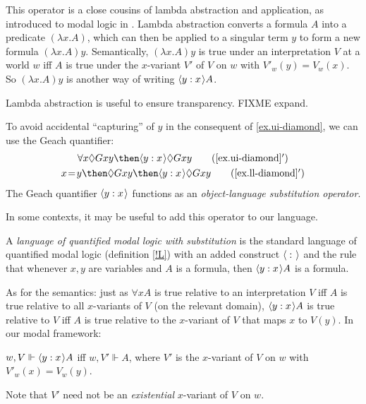 \documentclass[11pt]{woarticle}
\theoremstyle{break}
\theoremstyle{nonumberplain}
\newcommand{\SAT}{\Vdash}
\newcommand{\1}{\;\,|\;\,}
\renewcommand{\t}[1]{\ensuremath{\langle #1  \makebox[.2ex]{}\rangle}}
\begin{document}
This operator is a close cousins of lambda abstraction and application,
as introduced to modal logic in \cite{stalnaker68abstraction}. Lambda
abstraction converts a formula $A$ into a predicate $(\lambda x.A)$, which can
then be applied to a singular term $y$ to form a new formula $(\lambda x.A)y$.
Semantically, $(\lambda x.A)y$ is true under an interpretation $V$ at a world
$w$ iff $A$ is true under the $x$-variant $V'$ of $V$ on $w$ with
$V'_{w}(y)=V_w(x)$. So $(\lambda x.A)y$ is another way of writing $\t{y:x}A$.

Lambda abstraction is useful to ensure transparency. FIXME expand.

To avoid accidental ``capturing'' of $y$ in the consequent of
\eqref{ex.ui-diamond}, we can use the Geach quantifier:
\begin{gather}
  \forall x \Diamond Gxy \then \t{y:x}\Diamond Gxy \tag{\ref{ex.ui-diamond}$'$}\\
  x\!=\!y \then \Diamond Gxy \then \t{y:x}\Diamond Gxy \tag{\ref{ex.ll-diamond}$'$}
\end{gather}
The Geach quantifier $\t{y:x}$ functions as an \emph{object-language
  substitution operator}.

In some contexts, it may be useful to add this operator to our language.

\begin{definition}\label{langs}
  A \emph{language of quantified modal logic with substitution} is the standard
  language of quantified modal logic (definition \ref{!L}) with an added
  construct $\t{\; : }$ and the rule that whenever $x,y$ are variables and $A$
  is a formula, then $\t{y:x}A$ is a formula.
\end{definition}

As for the semantics: just as $\forall x A$ is true relative to an
interpretation $V$ iff $A$ is true relative to all $x$-variants of $V$
(on the relevant domain), $\t{y:x}A$ is true relative to $V$ iff $A$
is true relative to the $x$-variant of $V$ that maps $x$ to $V(y)$. In
our modal framework:

\begin{definition}\label{!SATG}
  \begin{semantics}
  \item[$w,V \SAT \t{y:x}A$] iff $w,V' \SAT A$, where $V'$ is the
    $x$-variant of $V$ on $w$ with $V'_w(x) = V_w(y)$.
  \end{semantics}
\end{definition}
\noindent%
Note that $V'$ need not be an \emph{existential} $x$-variant of $V$ on
$w$. 
\end{document}
